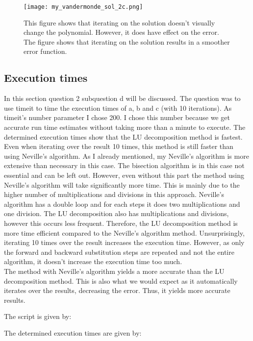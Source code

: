 \begin{figure}[h!]
  \centering
  \texttt{[image: my\_vandermonde\_sol\_2c.png]}
  \caption{This figure shows that iterating on the solution doesn't visually change the polynomial. However, it does have effect on the error. The figure shows that iterating on the solution results in a smoother error function. }
  \label{fig:2c}
\end{figure}

\subsection{Execution times}

In this section question 2 subquestion d will be discussed. The question was to use timeit to time the execution times of a, b and c (with 10 iterations). As timeit’s number parameter I chose 200. I chose this number because we get accurate run time estimates without taking more than a minute to execute. The determined execution times show that the LU decomposition method is fastest. Even when iterating over the result 10 times, this method is still faster than using Neville's algorithm. As I already mentioned, my Neville's algorithm is more extensive than necessary in this case. The bisection algorithm is in this case not essential and can be left out. However, even without this part the method using Neville's algorithm will take significantly more time. This is mainly due to the higher number of multiplications and divisions in this approach. Neville's algorithm has a double loop and for each steps it does two multiplications and one division. The LU decomposition also has multiplications and divisions, however this occurs less frequent. Therefore, the LU decomposition method is more time efficient compared to the Neville's algorithm method. Unsurprisingly, iterating 10 times over the result increases the execution time. However, as only the forward and backward substitution steps are repeated and not the entire algorithm, it doesn't increase the execution time too much. \\

\noindent The method with Neville's algorithm yields a more accurate than the LU decomposition method. This is also what we would expect as it automatically iterates over the results, decreasing the error. Thus, it yields more accurate results. 

The script is given by:


The determined execution times are given by:


